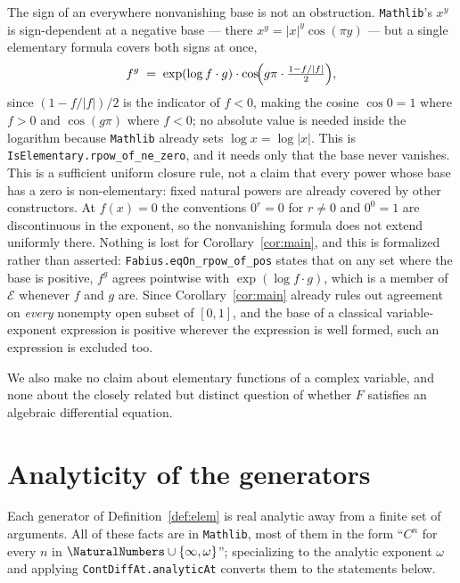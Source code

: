 \documentclass[11pt,oneside]{article}
\theoremstyle{definition}
\theoremstyle{remark}
\newcommand{\Elem}{\mathcal E}
\begin{document}
The sign of an everywhere nonvanishing base is not an obstruction.
\texttt{Mathlib}'s $x^y$ is sign-dependent at a
negative base --- there $x^y=|x|^y\cos(\pi y)$ --- but a single elementary
formula covers both signs at once,
\[
  f^{g}\;=\;\exp(\log f\cdot g)\cdot
           \cos\!\Bigl(g\pi\cdot\tfrac{1-f/|f|}{2}\Bigr),
\]
since $(1-f/|f|)/2$ is the indicator of $f<0$, making the cosine $\cos 0=1$
where $f>0$ and $\cos(g\pi)$ where $f<0$; no absolute value is needed inside
the logarithm because \texttt{Mathlib} already sets $\log x=\log|x|$.  This is
\texttt{IsElementary.rpow\_of\_ne\_zero}, and it needs only that the base never
vanishes.  This is a sufficient uniform closure rule, not a claim that every
power whose base has a zero is non-elementary: fixed natural powers are
already covered by other constructors.  At
$f(x)=0$ the conventions $0^r=0$ for $r\ne0$ and $0^0=1$ are discontinuous in
the exponent, so the nonvanishing formula does not extend uniformly there.
Nothing is lost for Corollary~\ref{cor:main}, and this is
formalized rather than asserted: \texttt{Fabius.eqOn\_rpow\_of\_pos}
states that on any set where the base is positive, $f^{g}$ agrees pointwise
with $\exp(\log f\cdot g)$, which is a member of $\Elem$ whenever $f$ and $g$
are.  Since Corollary~\ref{cor:main} already rules out agreement on \emph{every}
nonempty open subset of $[0,1]$, and the base of a classical
variable-exponent expression is positive wherever the expression is well
formed, such an expression is excluded too.

We also make no claim about elementary functions of a complex variable, and
none about the closely related but distinct question of whether $F$ satisfies
an algebraic differential equation.

\section{Analyticity of the generators}

Each generator of Definition~\ref{def:elem} is real analytic away from a finite set of
arguments.  All of these facts are in \texttt{Mathlib}, most of them in the
form ``$C^n$ for every $n$ in $\NaturalNumbers\cup\{\infty,\omega\}$''; specializing to the
analytic exponent $\omega$ and applying \texttt{ContDiffAt.analyticAt}
converts them to the statements below.
\end{document}
